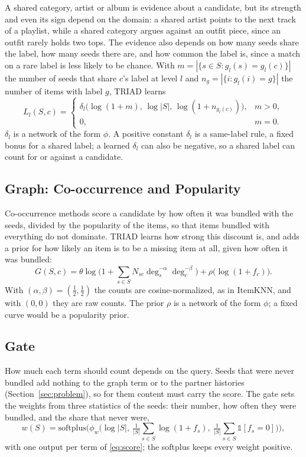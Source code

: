 \documentclass[runningheads]{llncs}
\begin{document}
A shared category, artist or album is evidence about a candidate, but its strength and even its sign depend on the
domain: a shared artist points to the next track of a playlist, while a shared
category argues against an outfit piece, since an outfit rarely holds two tops. The evidence also depends on how many
seeds share the label, how many seeds there are, and how common the label is, since a match on a rare label is less
likely to be chance. With $m=|\{s\in S:g_l(s)=g_l(c)\}|$ the number of seeds that share $c$'s label at level $l$ and
$n_g=|\{i:g_l(i)=g\}|$ the number of items with label $g$, TRIAD learns
\begin{equation}
L_l(S,c)=\begin{cases}\delta_l\big(\log(1+m),\,\log|S|,\,\log(1+n_{g_l(c)})\big), & m>0,\\ 0, & m=0.\end{cases}
\end{equation}
$\delta_l$ is a network of the form $\phi$. A positive constant $\delta_l$ is a same-label rule, a fixed bonus for a
shared label; a learned $\delta_l$ can also be negative, so a shared label can count for or against a candidate.

\subsection{Graph: Co-occurrence and Popularity}

Co-occurrence methods score a candidate by how often it was bundled with the seeds, divided by the popularity of the
items, so that items bundled with everything do not dominate. TRIAD learns how strong this discount is, and adds a
prior for how likely an item is to be a missing item at all, given how often it was bundled:
\begin{equation}
G(S,c)=\theta\log\Big(1+\textstyle\sum_{s\in S}N_{sc}\deg_s^{-\alpha}\deg_c^{-\beta}\Big)+\rho\big(\log(1+f_c)\big).
\end{equation}
With $(\alpha,\beta)=(\tfrac12,\tfrac12)$ the counts are cosine-normalized, as in ItemKNN, and with $(0,0)$ they are
raw counts. The prior $\rho$ is a network of the form $\phi$; a fixed curve would be a popularity prior.

\subsection{Gate}

How much each term should count depends on the query. Seeds that were never bundled add nothing to the graph term or
to the partner histories (Section~\ref{sec:problem}), so for them content must carry the score. The gate sets the
weights from three statistics of the seeds: their number, how often they were bundled, and the share that never were,
\begin{equation}
w(S)=\mathrm{softplus}\Big(\phi_w\Big(\log|S|,\ \tfrac{1}{|S|}\textstyle\sum_{s\in S}\log(1+f_s),\
\tfrac{1}{|S|}\textstyle\sum_{s\in S}\mathbb{1}[f_s=0]\Big)\Big),
\end{equation}
with one output per term of \eqref{eq:score}; the softplus keeps every weight positive.
\end{document}
